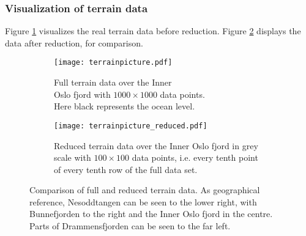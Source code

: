 \subsubsection*{Visualization of terrain data}
Figure \ref{fig:terrainpic} visualizes the real terrain data before reduction. Figure \ref{fig:terrainpic_reduced} displays the data after reduction, for comparison.

\begin{figure}[htbp]
	\centering
	\begin{subfigure}{.5\textwidth}
		\centering
		\texttt{[image: terrainpicture.pdf]}
		\caption{Full terrain data over the Inner \\Oslo fjord with $1000\times 1000$ data points. \\Here black represents the ocean level.}
		\label{fig:terrainpic}
	\end{subfigure}%
	\begin{subfigure}{.5\textwidth}
		\centering
		\texttt{[image: terrainpicture\_reduced.pdf]}
		\caption{Reduced terrain data over the Inner Oslo fjord in grey scale with $100\times 100$ data points, i.e. every tenth point of every tenth row of the full data set.}
	\label{fig:terrainpic_reduced}
	\end{subfigure}
	\caption{Comparison of full and reduced terrain data. As geographical reference, Nesoddtangen can be seen to the lower right, with Bunnefjorden to the right and the Inner Oslo fjord in the centre. Parts of Drammensfjorden can be seen to the far left.}
	\label{fig:terrain}
\end{figure}

